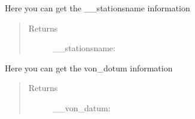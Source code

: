 \documentclass[letterpaper,10pt,english]{sphinxmanual}
\begin{document}
\begin{fulllineitems}
\begin{fulllineitems}
\begin{quote}
\begin{description}
\end{description}\end{quote}

\end{fulllineitems}


\begin{fulllineitems}
\label{\detokenize{DwdDataPrep:DwdDataPrep.Station.get_stationsname}}
\sphinxAtStartPar
{} Here you can get the \_\_stationsname information
\begin{quote}\begin{description}
\item[{Returns}] \leavevmode
\sphinxAtStartPar
\_\_stationsname: 

\end{description}\end{quote}

\end{fulllineitems}


\begin{fulllineitems}
\label{\detokenize{DwdDataPrep:DwdDataPrep.Station.get_von_datum}}
\sphinxAtStartPar
{} Here you can get the von\_dotum information
\begin{quote}\begin{description}
\item[{Returns}] \leavevmode
\sphinxAtStartPar
\_\_von\_datum: 

\end{description}\end{quote}

\end{fulllineitems}


\end{fulllineitems}

\end{document}
